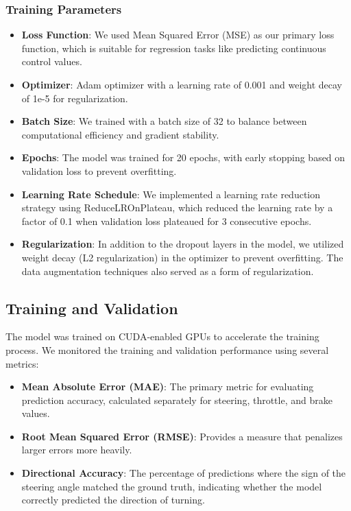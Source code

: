 \documentclass[pdflatex,sn-mathphys-num]{sn-jnl}%
\theoremstyle{thmstyleone}%
\theoremstyle{thmstyletwo}%
\theoremstyle{thmstylethree}%
\begin{document}
\subsubsection{Training Parameters}
\begin{itemize}
\item \textbf{Loss Function}: We used Mean Squared Error (MSE) as our primary loss function, which is suitable for regression tasks like predicting continuous control values.

\item \textbf{Optimizer}: Adam optimizer with a learning rate of 0.001 and weight decay of 1e-5 for regularization.

\item \textbf{Batch Size}: We trained with a batch size of 32 to balance between computational efficiency and gradient stability.

\item \textbf{Epochs}: The model was trained for 20 epochs, with early stopping based on validation loss to prevent overfitting.

\item \textbf{Learning Rate Schedule}: We implemented a learning rate reduction strategy using ReduceLROnPlateau, which reduced the learning rate by a factor of 0.1 when validation loss plateaued for 3 consecutive epochs.

\item \textbf{Regularization}: In addition to the dropout layers in the model, we utilized weight decay (L2 regularization) in the optimizer to prevent overfitting. The data augmentation techniques also served as a form of regularization.
\end{itemize}

\subsection{Training and Validation}
The model was trained on CUDA-enabled GPUs to accelerate the training process. We monitored the training and validation performance using several metrics:

\begin{itemize}
\item \textbf{Mean Absolute Error (MAE)}: The primary metric for evaluating prediction accuracy, calculated separately for steering, throttle, and brake values.
\item \textbf{Root Mean Squared Error (RMSE)}: Provides a measure that penalizes larger errors more heavily.
\item \textbf{Directional Accuracy}: The percentage of predictions where the sign of the steering angle matched the ground truth, indicating whether the model correctly predicted the direction of turning.
\end{itemize}
\end{document}
